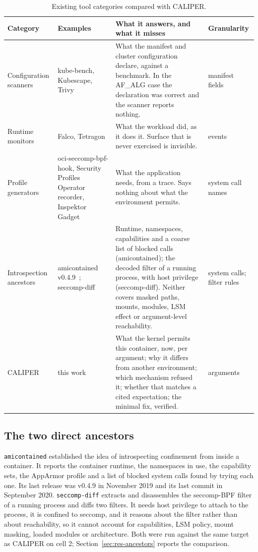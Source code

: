 \begin{table}[htbp]
\centering\small
\begin{tabularx}{\textwidth}{@{}P{2.7cm}P{4.1cm}LP{2.2cm}@{}}
\toprule
\textbf{Category} & \textbf{Examples} & \textbf{What it answers, and what it misses} & \textbf{Granularity} \\
\midrule
Configuration scanners & kube-bench, Kubescape, Trivy~\cite{kubebench,kubescape,trivy} & What the manifest and cluster configuration declare, against a benchmark. In the AF\_ALG case the declaration was correct and the scanner reports nothing. & manifest fields \\
Runtime monitors & Falco, Tetragon~\cite{falco,tetragon} & What the workload did, as it does it. Surface that is never exercised is invisible. & events \\
Profile generators & oci-seccomp-bpf-hook, Security Profiles Operator recorder, Inspektor Gadget~\cite{ocihook,spo,inspektor} & What the application needs, from a trace. Says nothing about what the environment permits. & system call names \\
Introspection ancestors & amicontained v0.4.9~\cite{amicontained}; seccomp-diff~\cite{seccompdiff} & Runtime, namespaces, capabilities and a coarse list of blocked calls (amicontained); the decoded filter of a running process, with host privilege (seccomp-diff). Neither covers masked paths, mounts, modules, LSM effect or argument-level reachability. & system calls; filter rules \\
\midrule
CALIPER & this work & What the kernel permits this container, now, per argument; why it differs from another environment; which mechanism refused it; whether that matches a cited expectation; the minimal fix, verified. & arguments \\
\bottomrule
\end{tabularx}
\caption{Existing tool categories compared with CALIPER.}
\label{tab:tools}
\end{table}

\subsection{The two direct ancestors}
\texttt{amicontained} established the idea of introspecting confinement from inside a container. It reports the container runtime, the namespaces in use, the capability sets, the AppArmor profile and a list of blocked system calls found by trying each one. Its last release was v0.4.9 in November 2019 and its last commit in September 2020. \texttt{seccomp-diff} extracts and disassembles the seccomp-BPF filter of a running process and diffs two filters. It needs host privilege to attach to the process, it is confined to seccomp, and it reasons about the filter rather than about reachability, so it cannot account for capabilities, LSM policy, mount masking, loaded modules or architecture. Both were run against the same target as CALIPER on cell 2; Section~\ref{sec:res-ancestors} reports the comparison.

